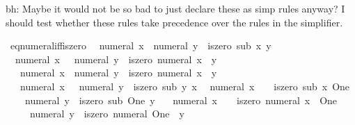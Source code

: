 \begin{isabellebody}
\begin{isamarkuptext}
  bh: Maybe it would not be so bad to just declare these as simp rules anyway?
  I should test whether these rules take precedence over the 
  rules in the simplifier.%
\end{isamarkuptext}\isamarkuptrue%
\isamarkupfalse%
\ eq{\isacharunderscore}{\kern0pt}numeral{\isacharunderscore}{\kern0pt}iff{\isacharunderscore}{\kern0pt}iszero{\isacharcolon}{\kern0pt}\isanewline
\ \ {\isachardoublequoteopen}numeral\ x\ {\isacharequal}{\kern0pt}\ numeral\ y\ {\isasymlongleftrightarrow}\ iszero\ {\isacharparenleft}{\kern0pt}sub\ x\ y{\isacharparenright}{\kern0pt}{\isachardoublequoteclose}\isanewline
\ \ {\isachardoublequoteopen}numeral\ x\ {\isacharequal}{\kern0pt}\ {\isacharminus}{\kern0pt}\ numeral\ y\ {\isasymlongleftrightarrow}\ iszero\ {\isacharparenleft}{\kern0pt}numeral\ {\isacharparenleft}{\kern0pt}x\ {\isacharplus}{\kern0pt}\ y{\isacharparenright}{\kern0pt}{\isacharparenright}{\kern0pt}{\isachardoublequoteclose}\isanewline
\ \ {\isachardoublequoteopen}{\isacharminus}{\kern0pt}\ numeral\ x\ {\isacharequal}{\kern0pt}\ numeral\ y\ {\isasymlongleftrightarrow}\ iszero\ {\isacharparenleft}{\kern0pt}numeral\ {\isacharparenleft}{\kern0pt}x\ {\isacharplus}{\kern0pt}\ y{\isacharparenright}{\kern0pt}{\isacharparenright}{\kern0pt}{\isachardoublequoteclose}\isanewline
\ \ {\isachardoublequoteopen}{\isacharminus}{\kern0pt}\ numeral\ x\ {\isacharequal}{\kern0pt}\ {\isacharminus}{\kern0pt}\ numeral\ y\ {\isasymlongleftrightarrow}\ iszero\ {\isacharparenleft}{\kern0pt}sub\ y\ x{\isacharparenright}{\kern0pt}{\isachardoublequoteclose}\isanewline
\ \ {\isachardoublequoteopen}numeral\ x\ {\isacharequal}{\kern0pt}\ {}\ {\isasymlongleftrightarrow}\ iszero\ {\isacharparenleft}{\kern0pt}sub\ x\ One{\isacharparenright}{\kern0pt}{\isachardoublequoteclose}\isanewline
\ \ {\isachardoublequoteopen}{}\ {\isacharequal}{\kern0pt}\ numeral\ y\ {\isasymlongleftrightarrow}\ iszero\ {\isacharparenleft}{\kern0pt}sub\ One\ y{\isacharparenright}{\kern0pt}{\isachardoublequoteclose}\isanewline
\ \ {\isachardoublequoteopen}{\isacharminus}{\kern0pt}\ numeral\ x\ {\isacharequal}{\kern0pt}\ {}\ {\isasymlongleftrightarrow}\ iszero\ {\isacharparenleft}{\kern0pt}numeral\ {\isacharparenleft}{\kern0pt}x\ {\isacharplus}{\kern0pt}\ One{\isacharparenright}{\kern0pt}{\isacharparenright}{\kern0pt}{\isachardoublequoteclose}\isanewline
\ \ {\isachardoublequoteopen}{}\ {\isacharequal}{\kern0pt}\ {\isacharminus}{\kern0pt}\ numeral\ y\ {\isasymlongleftrightarrow}\ iszero\ {\isacharparenleft}{\kern0pt}numeral\ {\isacharparenleft}{\kern0pt}One\ {\isacharplus}{\kern0pt}\ y{\isacharparenright}{\kern0pt}{\isacharparenright}{\kern0pt}{\isachardoublequoteclose}\isanewline

\end{isabellebody}

